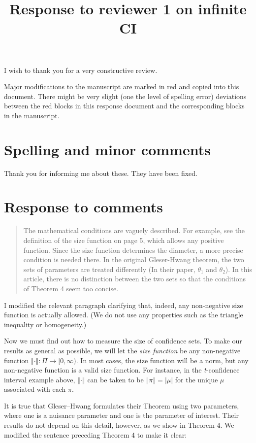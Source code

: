 \documentclass[a4paper]{article}
\title{Response to reviewer 1 on infinite CI}
\begin{document}
\maketitle
I wish to thank you for a very constructive review.

Major modifications to the manuscript are marked in red and copied into this document. There might be very slight (one the level of spelling error) deviations between the red blocks in this response document and the corresponding blocks in the manuscript.

\section*{Spelling and minor comments}Thank you for informing me about these. They have been fixed.

\section*{Response to comments}

\begin{quotation}The mathematical conditions are vaguely described. For example, see the definition of the size function on page 5, which allows any positive function. Since the size function determines the diameter, a more precise condition is needed there. In the original Gleser-Hwang theorem, the two sets of parameters are treated differently (In their paper, $\theta_1$ and $\theta_2$). In this article, there is no distinction between the two sets so that the conditions of Theorem 4 seem too concise.
\end{quotation}
I modified the relevant paragraph clarifying that, indeed, any non-negative size function is actually allowed. (We do not use any properties such as the triangle inequality or homogeneity.) 

{\color{red} Now we must find out how to measure the size of confidence sets. To make our results as general as possible, we will let the \emph{size function} be any non-negative function $\left\Vert \cdot\right\Vert :\Pi\to[0,\infty)$. In most cases, the size function will be a norm, but any non-negative function is a valid size function. For instance, in the \emph{t}-confidence interval example above, $\left\Vert \cdot\right\Vert $
can be taken to be $\left\Vert \pi\right\Vert =|\mu|$ for the unique
$\mu$ associated with each $\pi$. }

It is true that Gleser--Hwang formulates their Theorem using two parameters, where one is a nuisance parameter and one is the parameter of interest. Their results do not depend on this detail, however, as we show in Theorem 4. We modified the sentence preceding Theorem 4 to make it clear:
\end{document}

